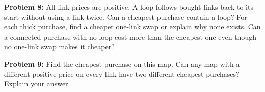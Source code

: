 \documentclass[12pt,letterpaper]{article}
\newcommand\problem[2]{\textbf{Problem #1:} #2\par}
\begin{document}
\vspace{0.75in}
\begin{center}
\begin{minipage}{0.48\linewidth}\centering\PriceDesign\end{minipage}\hfill
\begin{minipage}{0.48\linewidth}\centering\PriceDesign\end{minipage}
\end{center}

\newpage

\problem{8}{All link prices are positive. A loop follows bought links back to its start without using a link twice. Can a cheapest purchase contain a loop? For each thick purchase, find a cheaper one-link swap or explain why none exists. Can a connected purchase with no loop cost more than the cheapest one even though no one-link swap makes it cheaper?}

\vspace{0.35in}
\begin{center}\SixGood\end{center}
\vspace{0.25in}
\begin{center}\SixBad\end{center}

\newpage

\problem{9}{Find the cheapest purchase on this map. Can any map with a different positive price on every link have two different cheapest purchases? Explain your answer.}

\vspace{0.4in}
\begin{center}\Distinct\end{center}
\end{document}
